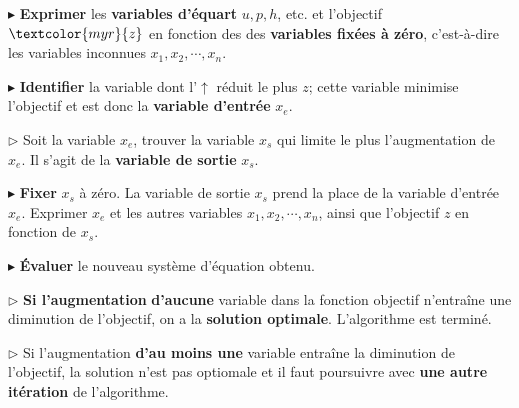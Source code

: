 \documentclass{report}
\begin{document}
\noindent 
$\blacktriangleright$ \textbf{Exprimer} les \textcolor{myb}{\textbf{variables d'équart}} 
$u, p, h$, etc. et l'objectif $\textcolor{myr}{z}$ en fonction des des 
\textbf{variables fixées à zéro}, c'est-à-dire les variables inconnues 
$x_1, x_2, \cdots,  x_n$.  

\noindent 
$\blacktriangleright$ \textbf{Identifier} la variable dont l'$\uparrow$ réduit le plus 
$z$; cette variable minimise l'objectif et est donc la 
\textcolor{myb}{\textbf{variable d'entrée}} $x_e$.

\noindent
$\rhd$ Soit la variable $x_e$, trouver la variable $x_s$ qui limite le plus l'augmentation 
de $x_e$. Il s'agit de la \textcolor{myr}{\textbf{variable de sortie}} $x_s$. 


\noindent 
$\blacktriangleright$ \textbf{Fixer} $x_s$ à zéro. La variable de sortie $x_s$ 
prend la place de la variable d'entrée $x_e$. Exprimer $x_e$ et les autres variables 
$x_1, x_2, \cdots, x_n$, ainsi que l'objectif $z$ en fonction de $x_s$. 


\noindent 
$\blacktriangleright$ \textbf{Évaluer} le nouveau système d'équation obtenu. 

\noindent 
$\rhd$ \textbf{Si l'augmentation } 
\textcolor{myr}{\textbf{d'aucune}} variable dans la fonction  objectif n'entraîne une  
diminution de l'objectif, on a la \textbf{solution optimale}. L'algorithme est terminé.  

\noindent 
$\rhd$ Si l'augmentation \textcolor{myr}{\textbf{d'au moins une}} variable entraîne  
la diminution de l'objectif, la solution n'est pas optiomale et il faut poursuivre avec 
\textbf{une autre itération} de l'algorithme.       
\pagebreak 
\end{document}
